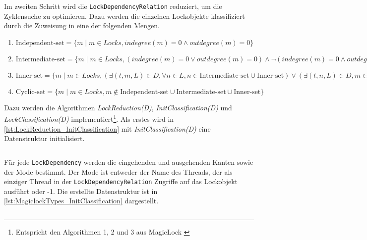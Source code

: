 Im zweiten Schritt wird die \texttt{Lock\-Dependency\-Relation} reduziert, um
die Zyklensuche zu optimieren. Dazu werden die einzelnen Lockobjekte
klassifiziert durch die Zuweisung in eine der folgenden
Mengen.\autocite[vgl.][4]{MagicLock}
\begin{enumerate}
  \item $\textrm{Independent-set} = \{m \mid m \in Locks, indegree(m) = 0 \land
  outdegree(m) = 0\}$
  \item $\textrm{Intermediate-set} = \{m \mid m \in Locks, (indegree(m) = 0 \lor
  outdegree(m) = 0) \land \lnot (indegree(m) = 0 \land outdegree(m) = 0)\}$
  \item $\textrm{Inner-set} = \{m \mid m \in Locks, (\exists (t,m,L) \in D,
  \forall n \in L, n \in \text{Intermediate-set} \cup \text{Inner-set}) \lor
  (\exists (t,n,L) \in D, m \in L \land n \in \text{Intermediate-set} \cup
  \text{Inner-set})\}$
  \item $\textrm{Cyclic-set} = \{m \mid m \in Locks, m \notin
  \text{Independent-set} \cup \text{Intermediate-set} \cup \text{Inner-set}\}$
\end{enumerate}
Dazu werden die Algorithmen \emph{LockReduction(D)},
\emph{InitClassification(D)} und \emph{LockClassification(D)}
implementiert\footnote{Entspricht den Algorithmen 1, 2 und 3 aus MagicLock
\autocite[5]{MagicLock}}. Als erstes wird in
\cref{lst:LockReduction_InitClassification} mit \emph{InitClassification(D)}
eine Datenstruktur initialisiert.
\begin{listing}[ht]
  \inputminted[frame=lines,linenos,firstline=17,lastline=32]{python}{./Python/magiclockLib/lockReduction.py}
  \caption{magiclockLib/lockReduction.py: Implementierung des \emph{InitClassification(D)}-Algorithmus aus Magiclock \autocite[5]{MagicLock}}
  \label{lst:LockReduction_InitClassification}
\end{listing}
Für jede \texttt{Lock\-Dependency} werden die eingehenden und ausgehenden Kanten
sowie der Mode bestimmt. Der Mode ist entweder der Name des Threads, der als
einziger Thread in der \texttt{Lock\-Dependency\-Relation} Zugriffe auf das
Lockobjekt ausführt oder -1. Die erstellte Datenstruktur ist in
\cref{lst:MagiclockTypes_InitClassification} dargestellt.
\begin{listing}[ht]
  \inputminted[frame=lines,linenos,firstline=3,lastline=8]{python}{./Python/magiclockLib/magiclockTypes.py}
  \caption{magiclockLib/magiclockTypes.py: Datenstruktur der \emph{init\_Classi\-fi\-cation(D)}-Methode}
  \label{lst:MagiclockTypes_InitClassification}
\end{listing}
